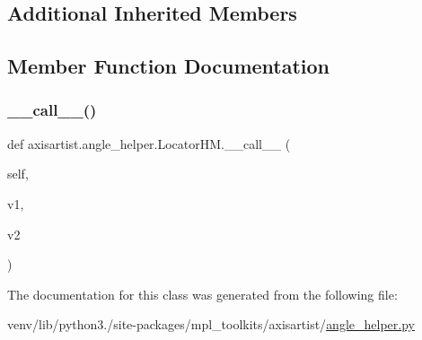 \subsection*{Additional Inherited Members}


\subsection{Member Function Documentation}
\mbox{\label{classaxisartist_1_1angle__helper_1_1LocatorHM_ac9a70b8f08bb5e9fceb101e0d5a2673c}} 
\subsubsection{\texorpdfstring{\+\_\+\+\_\+call\+\_\+\+\_\+()}{\_\_call\_\_()}}
{\footnotesize\ttfamily def axisartist.\+angle\+\_\+helper.\+Locator\+H\+M.\+\_\+\+\_\+call\+\_\+\+\_\+ (\begin{DoxyParamCaption}\item[{}]{self,  }\item[{}]{v1,  }\item[{}]{v2 }\end{DoxyParamCaption})}



The documentation for this class was generated from the following file\+:\begin{DoxyCompactItemize}
\item 
venv/lib/python3./site-\/packages/mpl\+\_\+toolkits/axisartist/\hyperlink{axisartist_2angle__helper_8py}{angle\+\_\+helper.\+py}\end{DoxyCompactItemize}
